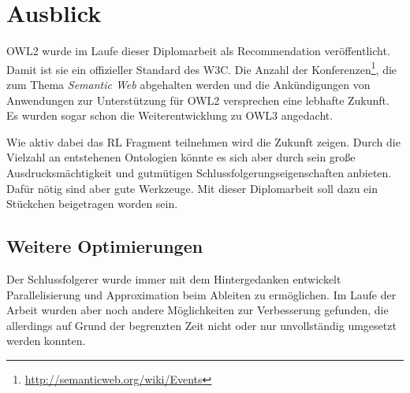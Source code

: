 \chapter{Ausblick}
\label{kapitel-ausblick}
OWL2 wurde im Laufe dieser Diplomarbeit als Recommendation veröffentlicht. Damit ist sie ein offizieller Standard des W3C. Die Anzahl der Konferenzen\footnote{\url{http://semanticweb.org/wiki/Events}}, die zum Thema \emph{Semantic Web} abgehalten werden und die Ankündigungen von Anwendungen zur Unterstützung für OWL2 versprechen eine lebhafte Zukunft. Es wurden sogar schon die Weiterentwicklung zu OWL3 \cite{Hitzler2009} angedacht.

Wie aktiv dabei das RL Fragment teilnehmen wird die Zukunft zeigen. Durch die Vielzahl an entstehenen Ontologien könnte es sich aber durch sein große Ausdrucksmächtigkeit und gutmütigen Schlussfolgerungseigenschaften anbieten. Dafür nötig sind aber gute Werkzeuge. Mit dieser Diplomarbeit soll dazu ein Stückchen beigetragen worden sein.

\section{Weitere Optimierungen}
\label{abschnitt-weitere-optimierungen}
Der Schlussfolgerer wurde immer mit dem  Hintergedanken entwickelt Parallelisierung und Approximation beim Ableiten zu ermöglichen. Im Laufe der Arbeit wurden aber noch andere Möglichkeiten zur Verbesserung gefunden, die allerdings auf Grund der begrenzten Zeit nicht oder nur unvollständig umgesetzt werden konnten.

